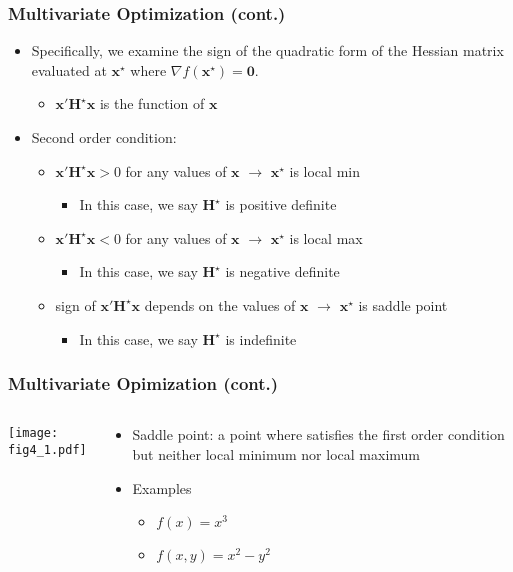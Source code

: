 \documentclass[pdflatex, 12pt]{beamer}
\begin{document}
\begin{frame}
\frametitle{Multivariate Optimization (cont.)}
\begin{itemize}
\item Specifically, we examine the sign of the quadratic form of the Hessian matrix evaluated at $\bm{x}^{\star}$ where $\nabla f(\bm{x}^{\star}) = \bm{0}$.
 \begin{itemize}
 \item $\bm{x}'\bm{H}^{\star}\bm{x}$ is the function of $\bm{x}$
 \end{itemize}
\vspace{0.4cm}
\item Second order condition:
 \begin{itemize}
 \item $\bm{x}'\bm{H}^{\star}\bm{x} > 0$ for any values of $\bm{x}$ $\rightarrow$ $\bm{x}^{\star}$ is {\color{red} local min}
  \begin{itemize}
  \item In this case, we say $\bm{H}^{\star}$ is {\color{red} positive definite}
  \end{itemize}
 \item $\bm{x}'\bm{H}^{\star}\bm{x} < 0$ for any values of $\bm{x}$ $\rightarrow$ $\bm{x}^{\star}$ is {\color{red} local max}
  \begin{itemize}
  \item In this case, we say $\bm{H}^{\star}$ is {\color{red} negative definite}
  \end{itemize}
 \item sign of $\bm{x}'\bm{H}^{\star}\bm{x}$ depends on the values of $\bm{x}$ $\rightarrow$ $\bm{x}^{\star}$ is {\color{red} saddle point}
  \begin{itemize}
  \item In this case, we say $\bm{H}^{\star}$ is {\color{red} indefinite}
  \end{itemize}
 \end{itemize}
\end{itemize}
\end{frame}

\begin{frame}
\frametitle{Multivariate Opimization (cont.)}
\begin{columns}
\begin{column}{0.5\textwidth}
\texttt{[image: fig4\_1.pdf]}
\end{column}
\begin{column}{0.5\textwidth}
\begin{itemize}
\item Saddle point: a point where satisfies the first order condition but neither local minimum nor local maximum
\vspace{0.4cm}
\item Examples
 \begin{itemize}
 \item $f(x) = x^3$
 \item $f(x, y) = x^2 - y^2$
 \end{itemize}
\end{itemize}
\end{column}
\end{columns}
\end{frame}
\end{document}

